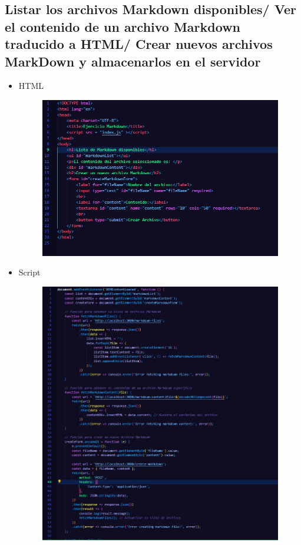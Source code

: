\documentclass{article}
\begin{document}
	\subsection{Listar los archivos Markdown disponibles/ Ver el contenido de un archivo Markdown traducido a HTML/ Crear nuevos archivos MarkDown y almacenarlos en el servidor}
	\begin{itemize}
		\item HTML
		\begin{figure}[H]
			\centering
			\includegraphics[width=1.0\textwidth,keepaspectratio]{img/HTMLT1.jpg}
		\end{figure}
		\item Script
		\begin{figure}[H]
			\centering
			\includegraphics[width=1.0\textwidth,keepaspectratio]{img/ScriptT1.jpg}

\end{figure}
\end{itemize}
\end{document}
